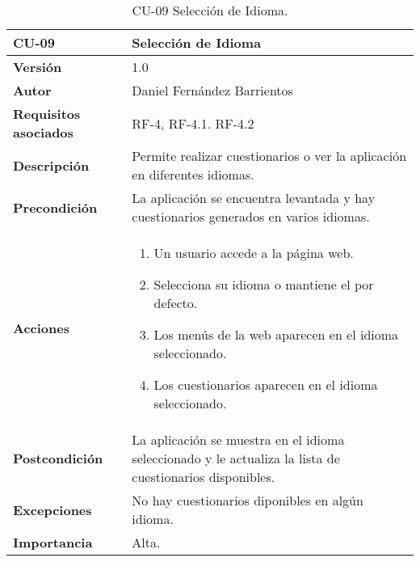 \begin{table}[p]
	\centering
	\begin{tabularx}{\linewidth}{ p{} p{} }
		\toprule
		\textbf{CU-09}    & \textbf{Selección de Idioma}\\
		\toprule
		\textbf{Versión}              & 1.0    \\
		\textbf{Autor}                & Daniel Fernández Barrientos \\
		\textbf{Requisitos asociados} & RF-4, RF-4.1. RF-4.2 \\
		\textbf{Descripción}          & Permite realizar cuestionarios o ver la aplicación en diferentes idiomas. \\
		\textbf{Precondición}         & La aplicación se encuentra levantada y hay cuestionarios generados en varios idiomas. \\
		\textbf{Acciones}             &
		\begin{enumerate}
			\def\labelenumi{\arabic{enumi}.}
			\tightlist
			\item Un usuario accede a la página web.
			\item Selecciona su idioma o mantiene el por defecto.
			\item Los menús de la web aparecen en el idioma seleccionado.
			\item Los cuestionarios aparecen en el idioma seleccionado.
		\end{enumerate}\\
		\textbf{Postcondición}        & La aplicación se muestra en el idioma seleccionado y le actualiza la lista de cuestionarios disponibles. \\
		\textbf{Excepciones}          & No hay cuestionarios diponibles en algún idioma. \\
		\textbf{Importancia}          & Alta. \\
		\bottomrule
	\end{tabularx}
	\caption{CU-09 Selección de Idioma.}
\end{table}


